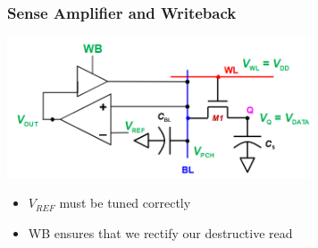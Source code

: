 \documentclass{article}
\begin{document}
\subsubsection{Sense Amplifier and Writeback}
\begin{minipage}[c]{0.5\textwidth}
    \vspace{0pt}
    \includegraphics[width=9cm, scale=1]{dramRead_chargeSensing.PNG}
\end{minipage}%
\begin{minipage}[c]{0.5\textwidth}
    \begin{itemize}
        \item $V_{REF}$ must be tuned correctly
        \item WB ensures that we rectify our destructive read
    \end{itemize}
\end{minipage}
\end{document}
